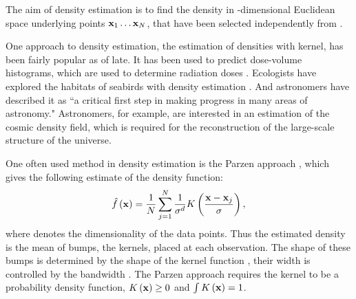 The aim of density estimation is to find the density \varDensityFunction{\varPattern} in \varDim-dimensional Euclidean space underlying \varNumPatterns points $\varPattern[1] \dotsc \varPattern[\varNumPatterns]$, that have been selected independently from \varDensityFunction{\varPattern}. 

One approach to density estimation, the estimation of densities with kernel, has been fairly popular as of late. It has been used to predict dose-volume histograms, which are used to determine radiation doses \cite{SkarpmanDose2015}. Ecologists have explored the habitats of seabirds with density estimation \cite{lees2016using}. And astronomers have described it as ``a critical first step in making progress in many areas of astronomy." \cite{ferdosi2011comparison} Astronomers, for example, are interested in an estimation of the cosmic density field, which is required for the reconstruction of the large-scale structure of the universe.

One often used method in density estimation is the Parzen approach \cite{parzen1962estimation}, which gives the following estimate of the density function:
\begin{equation}\label{eq:1:parzen}
	\varEstimatedDensityFunction{\varPattern} = \frac{1}{\varNumPatterns}\sum_{j = 1}^{\varNumPatterns} \frac{1}{\varBandwidth^\varDim}\varKernel{\frac{\varPattern - \varPattern[j]}{\varBandwidth}},
\end{equation}
where \varDim denotes the dimensionality of the data points.
%
Thus the estimated density is the mean of bumps, the kernels, placed at each observation. The shape of these bumps is determined by the shape of the kernel function \varKernel{\cdot}, their width is controlled by the bandwidth \varBandwidth \cite{silverman1986density}. The Parzen approach requires the kernel to be a probability density function, \ie $\varKernel{\varPattern} \geq 0$ and $\int \varKernel{\varPattern} = 1$.

